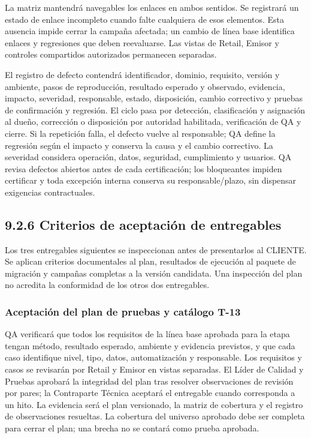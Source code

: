 \documentclass[11pt]{article}
\begin{document}
La matriz mantendrá navegables los enlaces en ambos sentidos. Se registrará un estado de enlace incompleto cuando falte cualquiera de esos elementos. Esta ausencia impide cerrar la campaña afectada; un cambio de línea base identifica enlaces y regresiones que deben reevaluarse. Las vistas de Retail, Emisor y controles compartidos autorizados permanecen separadas.

El registro de defecto contendrá identificador, dominio, requisito, versión y ambiente, pasos de reproducción, resultado esperado y observado, evidencia, impacto, severidad, responsable, estado, disposición, cambio correctivo y pruebas de confirmación y regresión. El ciclo pasa por detección, clasificación y asignación al dueño, corrección o disposición por autoridad habilitada, verificación de QA y cierre. Si la repetición falla, el defecto vuelve al responsable; QA define la regresión según el impacto y conserva la causa y el cambio correctivo. La severidad considera operación, datos, seguridad, cumplimiento y usuarios. QA revisa defectos abiertos antes de cada certificación; los bloqueantes impiden certificar y toda excepción interna conserva su responsable/plazo, sin dispensar exigencias contractuales.

\subsection{9.2.6 Criterios de aceptación de entregables}

Los tres entregables siguientes se inspeccionan antes de presentarlos al CLIENTE. Se aplican criterios documentales al plan, resultados de ejecución al paquete de migración y campañas completas a la versión candidata. Una inspección del plan no acredita la conformidad de los otros dos entregables.

\subsubsection{Aceptación del plan de pruebas y catálogo T-13}

QA verificará que todos los requisitos de la línea base aprobada para la etapa tengan método, resultado esperado, ambiente y evidencia previstos, y que cada caso identifique nivel, tipo, datos, automatización y responsable. Los requisitos y casos se revisarán por Retail y Emisor en vistas separadas. El Líder de Calidad y Pruebas aprobará la integridad del plan tras resolver observaciones de revisión por pares; la Contraparte Técnica aceptará el entregable cuando corresponda a un hito. La evidencia será el plan versionado, la matriz de cobertura y el registro de observaciones resueltas. La cobertura del universo aprobado debe ser completa para cerrar el plan; una brecha no se contará como prueba aprobada.
\end{document}
